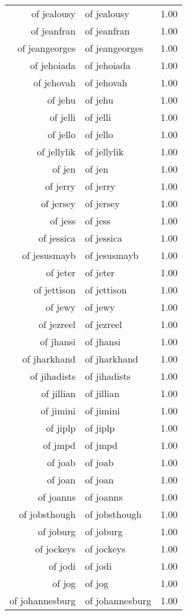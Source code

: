 \begin{table}[ht]
\begin{tabular}{rlr}
  of jealousy & of jealousy & 1.00 \\ 
  of jeanfran & of jeanfran & 1.00 \\ 
  of jeangeorges & of jeangeorges & 1.00 \\ 
  of jehoiada & of jehoiada & 1.00 \\ 
  of jehovah & of jehovah & 1.00 \\ 
  of jehu & of jehu & 1.00 \\ 
  of jelli & of jelli & 1.00 \\ 
  of jello & of jello & 1.00 \\ 
  of jellylik & of jellylik & 1.00 \\ 
  of jen & of jen & 1.00 \\ 
  of jerry & of jerry & 1.00 \\ 
  of jersey & of jersey & 1.00 \\ 
  of jess & of jess & 1.00 \\ 
  of jessica & of jessica & 1.00 \\ 
  of jesusmayb & of jesusmayb & 1.00 \\ 
  of jeter & of jeter & 1.00 \\ 
  of jettison & of jettison & 1.00 \\ 
  of jewy & of jewy & 1.00 \\ 
  of jezreel & of jezreel & 1.00 \\ 
  of jhansi & of jhansi & 1.00 \\ 
  of jharkhand & of jharkhand & 1.00 \\ 
  of jihadists & of jihadists & 1.00 \\ 
  of jillian & of jillian & 1.00 \\ 
  of jimini & of jimini & 1.00 \\ 
  of jiplp & of jiplp & 1.00 \\ 
  of jmpd & of jmpd & 1.00 \\ 
  of joab & of joab & 1.00 \\ 
  of joan & of joan & 1.00 \\ 
  of joanns & of joanns & 1.00 \\ 
  of jobsthough & of jobsthough & 1.00 \\ 
  of joburg & of joburg & 1.00 \\ 
  of jockeys & of jockeys & 1.00 \\ 
  of jodi & of jodi & 1.00 \\ 
  of jog & of jog & 1.00 \\ 
  of johannesburg & of johannesburg & 1.00 \\ 

\end{tabular}
\end{table}
